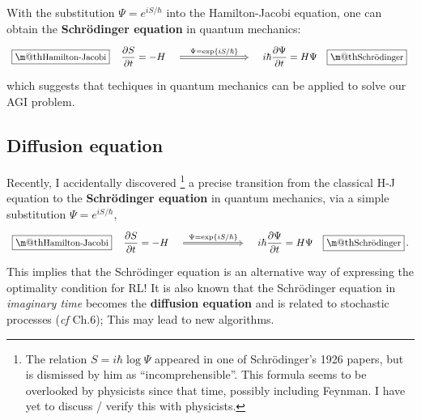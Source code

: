 \documentclass[orivec]{llncs}
\makeatletter
\newcommand{\emp}[1]{\textbf{#1}}
\renewcommand{\boxed}[1]{\fbox{\m@th$\displaystyle\scalebox{0.9}{#1}$} \,}
\makeatother
\begin{document}

With the substitution $\Psi = e^{i S / \hbar}$ into the Hamilton-Jacobi equation, one can obtain the \emp{Schr\"{o}dinger equation} in quantum mechanics:
\begin{equation}
\begin{tikzcd}[column sep = 7em]
\boxed{\mbox{Hamilton-Jacobi}} \quad \displaystyle \frac{\partial S}{\partial t} = - H \quad
\arrow[Rightarrow, r, "$\Psi = \exp \{ i S / \hbar \} $", align=center]
& \quad \displaystyle i \hbar \frac{\partial \Psi}{\partial t} = H \Psi \quad \boxed{\mbox{Schr\"{o}dinger}} 
\end{tikzcd}
\end{equation} 
which suggests that techiques in quantum mechanics can be applied to solve our AGI problem.


\subsection{Diffusion equation}

Recently, I accidentally discovered \cite{Yan2019}
\footnote{The relation $S = i \hbar \log \Psi$ appeared in one of Schr\"{o}dinger's 1926 papers, but is dismissed by him as ``incomprehensible''.  This formula seems to be overlooked by physicists since that time, possibly including Feynman.  I have yet to discuss / verify this with physicists.}
a precise transition from the classical H-J equation to the \emp{Schr\"{o}dinger equation} in quantum mechanics, via a simple substitution $\Psi = e^{i S / \hbar}$,
\begin{equation}
\begin{tikzcd}[column sep = 6em]
\boxed{\mbox{Hamilton-Jacobi}} \quad \displaystyle \frac{\partial S}{\partial t} = - H \quad
\arrow[Rightarrow, r, "$\Psi = \exp \{ i S / \hbar \} $", align=center]
& \quad \displaystyle i \hbar \frac{\partial \Psi}{\partial t} = H \Psi \quad \boxed{\mbox{Schr\"{o}dinger}} .
\end{tikzcd}
\end{equation} 
This implies that the Schr\"{o}dinger equation is an alternative way of expressing the optimality condition for RL!  It is also known that the Schr\"{o}dinger equation in \textit{imaginary time} becomes the \textbf{diffusion equation} and is related to stochastic processes (\textit{cf} \cite{Strocchi2008} Ch.6); This may lead to new algorithms.
\end{document}
